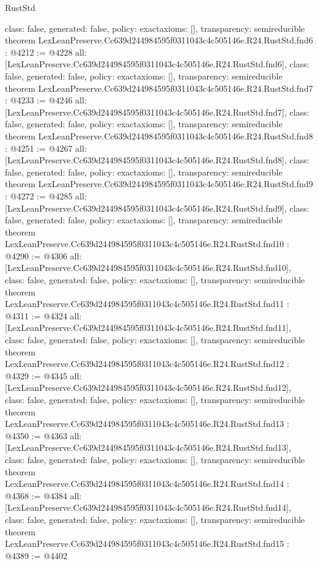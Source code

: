 \begin{lexlean}{RustStd}
\begin{coremodule}
{  class: false,
  generated: false,
  policy: exact{axioms: []},
  transparency: semireducible
}
theorem LexLeanPreserve.Cc639d244984595f0311043c4c505146e.R24.RustStd.fnd6 : @4212 := @4228 {
  all: [LexLeanPreserve.Cc639d244984595f0311043c4c505146e.R24.RustStd.fnd6],
  class: false,
  generated: false,
  policy: exact{axioms: []},
  transparency: semireducible
}
theorem LexLeanPreserve.Cc639d244984595f0311043c4c505146e.R24.RustStd.fnd7 : @4233 := @4246 {
  all: [LexLeanPreserve.Cc639d244984595f0311043c4c505146e.R24.RustStd.fnd7],
  class: false,
  generated: false,
  policy: exact{axioms: []},
  transparency: semireducible
}
theorem LexLeanPreserve.Cc639d244984595f0311043c4c505146e.R24.RustStd.fnd8 : @4251 := @4267 {
  all: [LexLeanPreserve.Cc639d244984595f0311043c4c505146e.R24.RustStd.fnd8],
  class: false,
  generated: false,
  policy: exact{axioms: []},
  transparency: semireducible
}
theorem LexLeanPreserve.Cc639d244984595f0311043c4c505146e.R24.RustStd.fnd9 : @4272 := @4285 {
  all: [LexLeanPreserve.Cc639d244984595f0311043c4c505146e.R24.RustStd.fnd9],
  class: false,
  generated: false,
  policy: exact{axioms: []},
  transparency: semireducible
}
theorem LexLeanPreserve.Cc639d244984595f0311043c4c505146e.R24.RustStd.fnd10 : @4290 := @4306 {
  all: [LexLeanPreserve.Cc639d244984595f0311043c4c505146e.R24.RustStd.fnd10],
  class: false,
  generated: false,
  policy: exact{axioms: []},
  transparency: semireducible
}
theorem LexLeanPreserve.Cc639d244984595f0311043c4c505146e.R24.RustStd.fnd11 : @4311 := @4324 {
  all: [LexLeanPreserve.Cc639d244984595f0311043c4c505146e.R24.RustStd.fnd11],
  class: false,
  generated: false,
  policy: exact{axioms: []},
  transparency: semireducible
}
theorem LexLeanPreserve.Cc639d244984595f0311043c4c505146e.R24.RustStd.fnd12 : @4329 := @4345 {
  all: [LexLeanPreserve.Cc639d244984595f0311043c4c505146e.R24.RustStd.fnd12],
  class: false,
  generated: false,
  policy: exact{axioms: []},
  transparency: semireducible
}
theorem LexLeanPreserve.Cc639d244984595f0311043c4c505146e.R24.RustStd.fnd13 : @4350 := @4363 {
  all: [LexLeanPreserve.Cc639d244984595f0311043c4c505146e.R24.RustStd.fnd13],
  class: false,
  generated: false,
  policy: exact{axioms: []},
  transparency: semireducible
}
theorem LexLeanPreserve.Cc639d244984595f0311043c4c505146e.R24.RustStd.fnd14 : @4368 := @4384 {
  all: [LexLeanPreserve.Cc639d244984595f0311043c4c505146e.R24.RustStd.fnd14],
  class: false,
  generated: false,
  policy: exact{axioms: []},
  transparency: semireducible
}
theorem LexLeanPreserve.Cc639d244984595f0311043c4c505146e.R24.RustStd.fnd15 : @4389 := @4402 {
}
\end{coremodule}
\end{lexlean}
